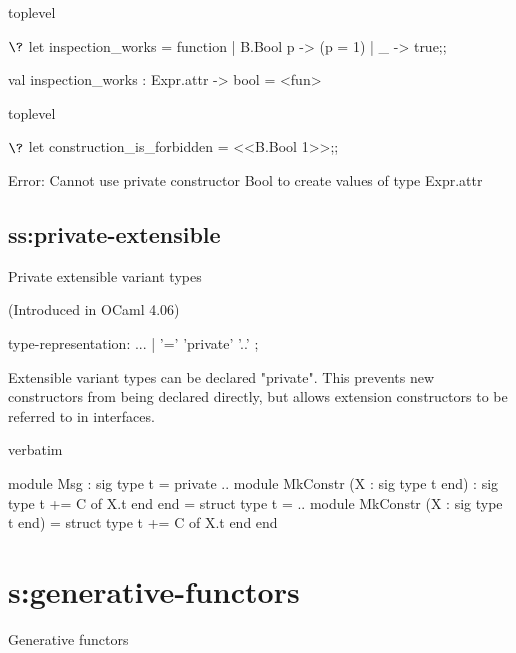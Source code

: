 {\begin{camlexample}{toplevel}
\begin{caml}
\begin{camlinput}
$\?$ let inspection_works = function
    | B.Bool p -> (p = 1)
    | _ -> true;;
\end{camlinput}
\begin{camloutput}
val inspection_works : Expr.attr -> bool = <fun>
\end{camloutput}
\end{caml}
\end{camlexample}
\begin{camlexample}{toplevel}
\begin{caml}
\begin{camlinput}
$\?$ let construction_is_forbidden = <<B.Bool 1>>;;
\end{camlinput}
\begin{camlerror}
Error: Cannot use private constructor Bool to create values of type Expr.attr
\end{camlerror}
\end{caml}
\end{camlexample}

\subsection{ss:private-extensible}{Private extensible variant types}

(Introduced in OCaml 4.06)

\begin{syntax}
type-representation:
          ...
        | '=' 'private' '..'
;
\end{syntax}

Extensible variant types can be declared "private". This prevents new
constructors from being declared directly, but allows extension
constructors to be referred to in interfaces.
\begin{camlexample}{verbatim}
\begin{caml}
\begin{camlinput}
module Msg : sig
  type t = private ..
  module MkConstr (X : sig type t end) : sig
    type t += C of X.t
  end
end = struct
  type t = ..
  module MkConstr (X : sig type t end) = struct
    type t += C of X.t
  end
end
\end{camlinput}
\end{caml}
\end{camlexample}

\section{s:generative-functors}{Generative functors}

}
